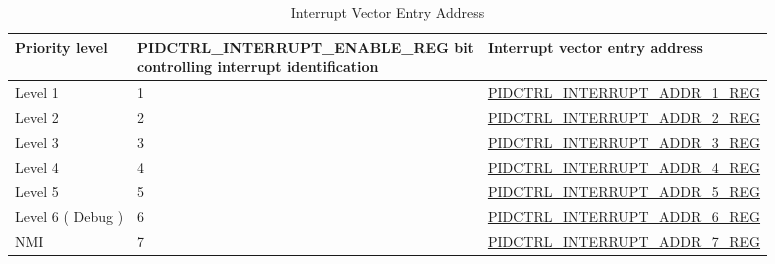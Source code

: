 
\begin{table}[H]
    \centering
    \caption{Interrupt Vector Entry Address}
    \label{table:Interrupt}
    \begin{tabular}{|p{2.5cm}|p{6.5cm}|p{6cm}|}
        \hline
        \rowcolor{lightgray}
        Priority level &
        \makecell[l]{PIDCTRL\_INTERRUPT\_ENABLE\_REG bit\\controlling interrupt identification} &
        Interrupt vector entry address \\
        \hline
        Level 1 & 1 & \hyperref[regdesc:PIDCTRLINTERRUPTADDR1REG]{PIDCTRL\_INTERRUPT\_ADDR\_1\_REG}\\
        \hline
        Level 2 & 2 & \hyperref[regdesc:PIDCTRLINTERRUPTADDR2REG]{PIDCTRL\_INTERRUPT\_ADDR\_2\_REG} \\
        \hline
        Level 3 & 3 & \hyperref[regdesc:PIDCTRLINTERRUPTADDR3REG]{PIDCTRL\_INTERRUPT\_ADDR\_3\_REG}\\
        \hline
        Level 4 & 4 & \hyperref[regdesc:PIDCTRLINTERRUPTADDR4REG]{PIDCTRL\_INTERRUPT\_ADDR\_4\_REG}\\
        \hline
        Level 5 & 5 & \hyperref[regdesc:PIDCTRLINTERRUPTADDR5REG]{PIDCTRL\_INTERRUPT\_ADDR\_5\_REG}\\
        \hline
        Level 6 ( Debug ) & 6 & \hyperref[regdesc:PIDCTRLINTERRUPTADDR6REG]{PIDCTRL\_INTERRUPT\_ADDR\_6\_REG}\\
        \hline
        NMI & 7 & \hyperref[regdesc:PIDCTRLINTERRUPTADDR7REG]{PIDCTRL\_INTERRUPT\_ADDR\_7\_REG}\\
        \hline
    \end{tabular}
\end{table}
